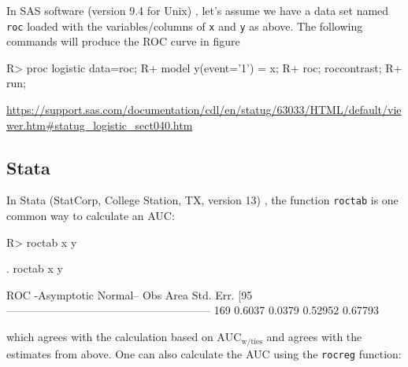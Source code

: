 \documentclass[article]{jss}
\begin{document}
In SAS software (version 9.4 for Unix) \citep{sas}, let's assume we have
a data set named \texttt{roc} loaded with the variables/columns of
\texttt{x} and \texttt{y} as above. The following commands will produce
the ROC curve in figure

\begin{CodeChunk}

\begin{CodeInput}
R>   proc logistic data=roc;
R+       model y(event='1') = x;
R+       roc; roccontrast;
R+       run;      
\end{CodeInput}
\end{CodeChunk}

\url{https://support.sas.com/documentation/cdl/en/statug/63033/HTML/default/viewer.htm\#statug_logistic_sect040.htm}

\hypertarget{stata}{%
\subsection{Stata}\label{stata}}

In Stata (StatCorp, College Station, TX, version 13) \citep{stata}, the
function \texttt{roctab} is one common way to calculate an AUC:

\begin{CodeChunk}

\begin{CodeInput}
R> roctab x y
\end{CodeInput}


\begin{CodeOutput}
 . roctab x y

                      ROC                    -Asymptotic Normal--
           Obs       Area     Std. Err.      [95%
         --------------------------------------------------------
           169     0.6037       0.0379        0.52952     0.67793
\end{CodeOutput}
\end{CodeChunk}

which agrees with the calculation based on
\(\text{AUC}_{\text{w/ties}}\) and agrees with the estimates from above.
One can also calculate the AUC using the \texttt{rocreg} function:
\end{document}
